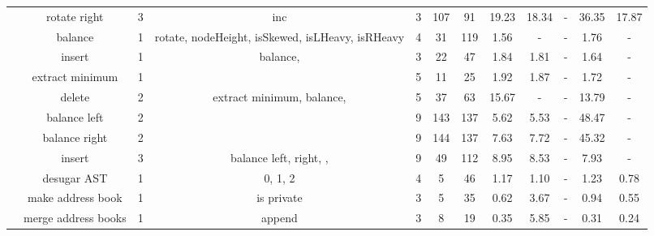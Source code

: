 \documentclass[10pt,preprint]{sigplanconf-pldi16}
\theoremstyle{definition}
\newcommand{\tool}{\textsc{Synquid}\xspace}
\newcommand{\head}[1]{\emph{#1}}
\begin{document}
\begin{table*}[!htbp]
\begin{center}
{\begin{tabular}{@{} r|c| cccc | cccccc @{}}
 & rotate right & 3 & inc & 3 & 107 & 91 & 19.23 & 18.34 & - & 36.35 & 17.87 \\
 & balance & 1 & rotate, nodeHeight, isSkewed, isLHeavy, isRHeavy & 4 & 31 & 119 & 1.56 & - & - & 1.76 & - \\
 & insert & 1 & balance,  & 3 & 22 & 47 & 1.84 & 1.81 & - & 1.64 & - \\
 & extract minimum & 1 &  & 5 & 11 & 25 & 1.92 & 1.87 & - & 1.72 & - \\
 & delete & 2 & extract minimum, balance,  & 5 & 37 & 63 & 15.67 & - & - & 13.79 & - \\
\hline\multirow{3}{*}{\parbox{1cm}{\vspace{-0.85\baselineskip}}} & balance left & 2 &  & 9 & 143 & 137 & 5.62 & 5.53 & - & 48.47 & - \\
 & balance right & 2 &  & 9 & 144 & 137 & 7.63 & 7.72 & - & 45.32 & - \\
 & insert & 3 & balance left, right, ,  & 9 & 49 & 112 & 8.95 & 8.53 & - & 7.93 & - \\
\hline\multirow{3}{*}{\parbox{1cm}{\vspace{-0.85\baselineskip}}} & desugar AST & 1 & 0, 1, 2 & 4 & 5 & 46 & 1.17 & 1.10 & - & 1.23 & 0.78 \\
 & make address book & 1 & is private & 3 & 5 & 35 & 0.62 & 3.67 & - & 0.94 & 0.55 \\
 & merge address books & 1 & append & 3 & 8 & 19 & 0.35 & 5.85 & - & 0.31 & 0.24 \\
\hline \end{tabular}
}
\end{center}
\caption{
Benchmarks and \tool results.
For each benchmark, we report the number of synthesis goals \head{\#G};
the set of provided \head{Components};
the number of defined measures \head{\#M};
cumulative size of \head{Spec}ification and synthesized \head{Code} (in AST nodes) for all goals;
as well as \tool running times (in seconds) with minimal bounds (\head{T-all}),
with default bounds (\head{T-def}),
without round-trip checking (\head{T-nrt}),
without type consistency checking (\head{T-ncc}),
and without \textsc{MUSFix} (\head{T-nmus}).
``-'' denotes timeout of 2 minutes or out of memory.
}
\label{fig:evaluation}
\end{table*}
\end{document}
